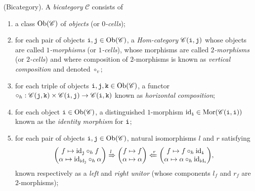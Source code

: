 \noindent\begin{definition}\textnormal{(Bicategory).} A {\em bicategory} $\mathscr{C}$ consists of
\begin{enumerate}[label=$\bullet$, leftmargin=4\parindent]
\item a class $\textnormal{Ob}(\mathscr{C})$ of {\em objects} (or {\em $0$-cells});
\item for each pair of objects $\textnormal{\texttt{i}}, \textnormal{\texttt{j}} \in \textnormal{Ob}(\mathscr{C})$, a {\em Hom-category} $\mathscr{C}(\textnormal{\texttt{i}}, \textnormal{\texttt{j}})$ whose objects are called {\em $1$-morphisms} (or {\em $1$-cells}), whose morphisms are called {\em $2$-morphisms} (or {\em $2$-cells}) and where composition of $2$-morphisms is known as {\em vertical composition} and denoted $\circ_v$;
\item for each triple of objects $\textnormal{\texttt{i}}, \textnormal{\texttt{j}}, \textnormal{\texttt{k}} \in \textnormal{Ob}(\mathscr{C})$, a functor $\circ_h : \mathscr{C}(\textnormal{\texttt{j}}, \textnormal{\texttt{k}}) \times \mathscr{C}(\textnormal{\texttt{i}}, \textnormal{\texttt{j}}) \to \mathscr{C}(\textnormal{\texttt{i}}, \textnormal{\texttt{k}})$ known as {\em horizontal composition};
\item for each object $\textnormal{\texttt{i}} \in \textnormal{Ob}(\mathscr{C})$, a distinguished $1$-morphism $\textnormal{id}_{\textnormal{\texttt{i}}} \in \textnormal{Mor}(\mathscr{C}(\textnormal{\texttt{i}}, \textnormal{\texttt{i}}))$ known as the {\em identity morphism} for $\textnormal{\texttt{i}}$;
\item for each pair of objects $\textnormal{\texttt{i}}, \textnormal{\texttt{j}} \in \textnormal{Ob}(\mathscr{C})$, natural isomorphisms $l$ and $r$ satisfying
\begin{align*}
\begin{split}
\begin{pmatrix}f \mapsto \textnormal{id}_{\textnormal{\texttt{j}}} \circ_h f\\\alpha \mapsto \textnormal{id}_{\textnormal{id}_{\textnormal{\texttt{j}}}} \circ_h \alpha\end{pmatrix} \xRightarrow{l} \begin{pmatrix}f \mapsto f\\\alpha \mapsto \alpha\end{pmatrix} \xLeftarrow{r} \begin{pmatrix}f \mapsto f \circ_h \textnormal{id}_{\textnormal{\texttt{i}}}\\\alpha \mapsto \alpha \circ_h \textnormal{id}_{\textnormal{id}_{\textnormal{\texttt{i}}}}\end{pmatrix}\!,
\end{split}
\end{align*}
known respectively as a {\em left} and {\em right unitor} (whose components $l_f$ and $r_f$ are $2$-morphisms);

\end{enumerate}
\end{definition}
